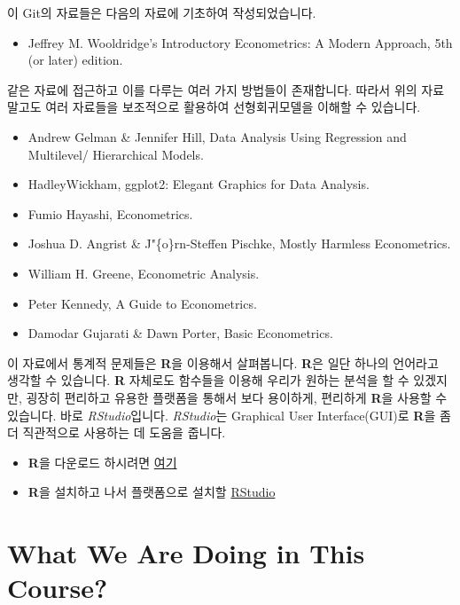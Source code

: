 \documentclass[
]{book}
\providecommand{\tightlist}{%
  \setlength{\itemsep}{0pt}\setlength{\parskip}{0pt}}
\begin{document}
이 Git의 자료들은 다음의 자료에 기초하여 작성되었습니다.

\begin{itemize}
\tightlist
\item
  Jeffrey M. Wooldridge's Introductory Econometrics: A Modern Approach, 5th (or later) edition.
\end{itemize}

같은 자료에 접근하고 이를 다루는 여러 가지 방법들이 존재합니다. 따라서 위의 자료 말고도 여러 자료들을 보조적으로 활용하여 선형회귀모델을 이해할 수 있습니다.

\begin{itemize}
\tightlist
\item
  Andrew Gelman \& Jennifer Hill, Data Analysis Using Regression and Multilevel/ Hierarchical Models.
\item
  HadleyWickham, ggplot2: Elegant Graphics for Data Analysis.
\item
  Fumio Hayashi, Econometrics.
\item
  Joshua D. Angrist \& J"\{o\}rn-Steffen Pischke, Mostly Harmless Econometrics.
\item
  William H. Greene, Econometric Analysis.
\item
  Peter Kennedy, A Guide to Econometrics.
\item
  Damodar Gujarati \& Dawn Porter, Basic Econometrics.
\end{itemize}

이 자료에서 통계적 문제들은 \textbf{R}을 이용해서 살펴봅니다. \textbf{R}은 일단 하나의 언어라고 생각할 수 있습니다. \textbf{R} 자체로도 함수들을 이용해 우리가 원하는 분석을 할 수 있겠지만, 굉장히 편리하고 유용한 플랫폼을 통해서 보다 용이하게, 편리하게 \textbf{R}을 사용할 수 있습니다. 바로 \emph{RStudio}입니다. \emph{RStudio}는 Graphical User Interface(GUI)로 \textbf{R}을 좀 더 직관적으로 사용하는 데 도움을 줍니다.

\begin{itemize}
\tightlist
\item
  \textbf{R}을 다운로드 하시려면 \href{https://cloud.r-project.org/}{여기}
\item
  \textbf{R}을 설치하고 나서 플랫폼으로 설치할 \href{https://www.rstudio.com/products/rstudio/download/\#download}{RStudio}
\end{itemize}

\hypertarget{what-we-are-doing-in-this-course}{%
\chapter{What We Are Doing in This Course?}\label{what-we-are-doing-in-this-course}}
\end{document}
